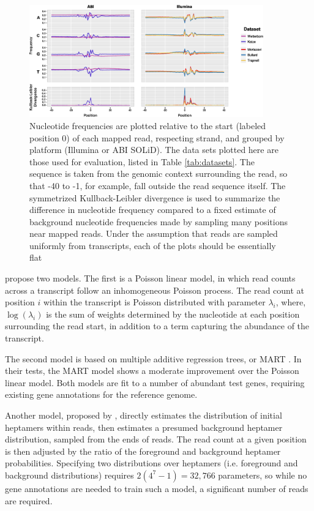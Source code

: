 \documentclass{bioinfo}
\begin{document}
\begin{figure}
\centerline{\includegraphics[width=0.9\textwidth]{freqs.eps}}
\caption{Nucleotide frequencies are plotted relative to the start (labeled
position 0) of each mapped read, respecting strand, and grouped by platform
(Illumina or ABI SOLiD).  The data sets plotted here are those used
for evaluation, listed in Table \ref{tab:datasets}.
The sequence is taken from the genomic context surrounding the read, so that -40
to -1, for example, fall outside the read sequence itself. The symmetrized
Kullback-Leibler divergence is used to summarize the difference in nucleotide
frequency compared to a fixed estimate of background nucleotide frequencies made
by sampling many positions near mapped reads.  Under the assumption that reads
are sampled uniformly from transcripts, each of the plots should be essentially
flat}
\label{fig:freqs}
\end{figure}

\citet{Li2010} propose two models. The first is a Poisson linear
model, in which read counts across a transcript follow an inhomogeneous Poisson
process. The read count at position $i$ within the transcript is Poisson
distributed with parameter $\lambda_i$, where, $\log(\lambda_i)$ is the sum of
weights determined by the nucleotide at each position surrounding the read
start, in addition to a term capturing the abundance of the transcript.

The second model is based on multiple additive regression trees, or MART
\citep{Friedman2003}.  In their tests, the MART model shows a moderate
improvement over the Poisson linear model. Both models are fit to a number of
abundant test genes, requiring existing gene annotations for the reference
genome. 

Another model, proposed by \citet{Hansen2010}, directly estimates the
distribution of initial heptamers within reads, then estimates a presumed
background heptamer distribution, sampled from the ends of reads. The read count
at a given position is then adjusted by the ratio of the foreground and
background heptamer probabilities. Specifying two distributions over heptamers
(i.e. foreground and background distributions) requires \mbox{$2(4^7-1) =
32,766$}
parameters, so while no gene annotations are needed to train such a model, a
significant number of reads are required.
\end{document}
